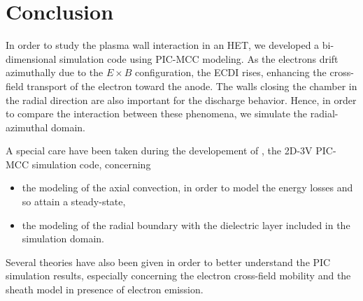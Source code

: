 


\section{Conclusion}
  \label{sec-conclusion_ch1}
  

  In order to study the plasma wall interaction in an \ac{HET}, we developed a bi-dimensional simulation code using \ac{PIC}-\ac{MCC} modeling.
  As the electrons drift azimuthally due to the $E \times B$ configuration, the \ac{ECDI} rises, enhancing the cross-field transport of the electron toward the anode.
  The walls closing the chamber in the radial direction are also important for the discharge behavior.
  Hence, in order to compare the interaction between these phenomena, we simulate the radial-azimuthal domain.
  
  A special care have been taken during the developement of \LPPic, the \ac{2D}-\ac{3V} \ac{PIC}-\ac{MCC} simulation code, concerning
  \begin{itemize}
    \item the modeling of the axial convection, in order to model the energy losses and so attain a steady-state,
    \item the modeling of the radial boundary with the dielectric layer included in the simulation domain.
  \end{itemize}
  
  Several theories have also been given in order to better understand the \ac{PIC} simulation results, especially concerning the electron cross-field mobility and the sheath model in presence of electron emission.